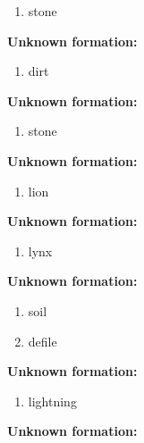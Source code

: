 \begin{enumerate}
\item stone
\end{enumerate}
\noindent\textbf{Unknown formation:}\\

\begin{enumerate}
\item dirt
\end{enumerate}
\noindent\textbf{Unknown formation:}\\

\begin{enumerate}
\item stone
\end{enumerate}
\noindent\textbf{Unknown formation:}\\

\begin{enumerate}
\item lion
\end{enumerate}
\noindent\textbf{Unknown formation:}\\

\begin{enumerate}
\item lynx
\end{enumerate}
\noindent\textbf{Unknown formation:}\\
{
{
}}

\begin{enumerate}
\item soil
\item defile
\end{enumerate}
\noindent\textbf{Unknown formation:}\\

\begin{enumerate}
\item lightning
\end{enumerate}
\noindent\textbf{Unknown formation:}\\

